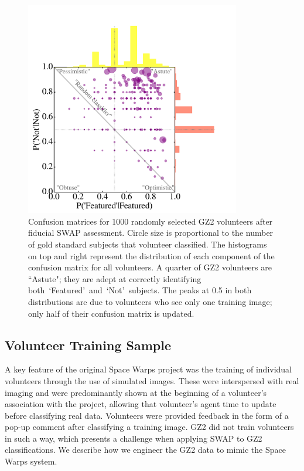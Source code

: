 \documentclass[twocolumn]{aastex6}
\newcommand{\feat}{`Featured'}
\newcommand{\notfeat}{`Not'}
\begin{document}
\begin{figure}[t!]
\includegraphics[width=3.7in]{f2.pdf}
\caption{Confusion matrices for 1000 randomly selected GZ2 volunteers after fiducial SWAP assessment. Circle size is proportional to the number of gold standard subjects that volunteer classified. The histograms on top and right represent the distribution of each component of the confusion matrix for all volunteers.  A quarter of GZ2 volunteers are ``Astute"; they are adept at correctly identifying both~\feat~and~\notfeat~subjects. The peaks at 0.5 in both distributions are due to volunteers who see only one training image; only half of their confusion matrix is updated. \label{fig: volunteer training}}
\end{figure}

\subsection{Volunteer Training Sample}\label{sec: training sample}

A key feature of the original Space Warps project was the training of 
individual volunteers through the use of simulated images.
These were interspersed with real imaging and were 
predominantly shown at the beginning of a volunteer's association with the project, 
allowing that volunteer's agent time to update before classifying real data. 
Volunteers were provided feedback in the form of a pop-up comment after
classifying a training image. GZ2 did not train volunteers in such a way, which
presents a challenge when applying SWAP to GZ2 classifications. 
We describe how we engineer the GZ2 data to mimic the Space 
Warps system.
\end{document}
